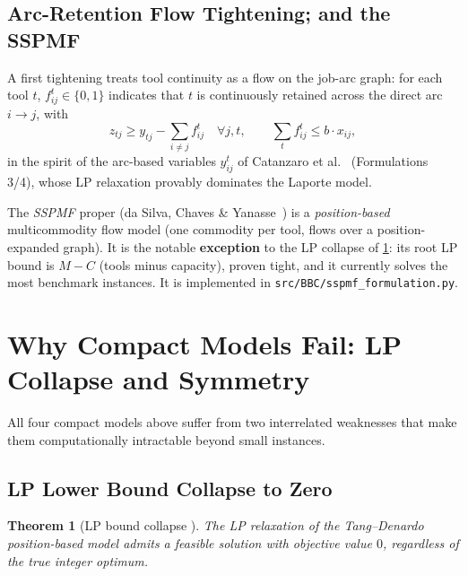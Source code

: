 \documentclass[11pt,a4paper]{article}
\theoremstyle{plain}
\newtheorem{theorem}{Theorem}[section]
\theoremstyle{definition}
\begin{document}
\subsection{Arc-Retention Flow Tightening; and the SSPMF}

A first tightening treats tool continuity as a flow on the job-arc graph: for
each tool $t$, $f^t_{ij} \in \{0,1\}$ indicates that $t$ is continuously
retained across the direct arc $i \to j$, with
\[
  z_{tj} \ge y_{tj} - \sum_{i \ne j} f^t_{ij}
  \quad \forall j, t, \qquad \sum_t f^t_{ij} \le b \cdot x_{ij},
\]
in the spirit of the arc-based variables $y^t_{ij}$ of Catanzaro et
al.~\cite{Catanzaro2015} (Formulations 3/4), whose LP relaxation provably
dominates the Laporte model.

The \emph{SSPMF} proper (da Silva, Chaves \& Yanasse~\cite{daSilva2024}) is a
\emph{position-based} multicommodity flow model (one commodity per tool, flows
over a position-expanded graph). It is the notable \textbf{exception} to the LP
collapse of \cref{thm:lp_collapse}: its root LP bound is $M-C$ (tools minus
capacity), proven tight, and it currently solves the most benchmark instances.
It is implemented in \texttt{src/BBC/sspmf\_formulation.py}.

\section{Why Compact Models Fail: LP Collapse and Symmetry}
\label{sec:lp_failure}

All four compact models above suffer from two interrelated weaknesses that make
them computationally intractable beyond small instances.

\subsection{LP Lower Bound Collapse to Zero}

\begin{thmbox}
\begin{theorem}[LP bound collapse \cite{Laporte2004}]
\label{thm:lp_collapse}
The LP relaxation of the Tang--Denardo position-based model admits a feasible
solution with objective value $0$, regardless of the true integer optimum.
\end{theorem}
\end{thmbox}
\end{document}
